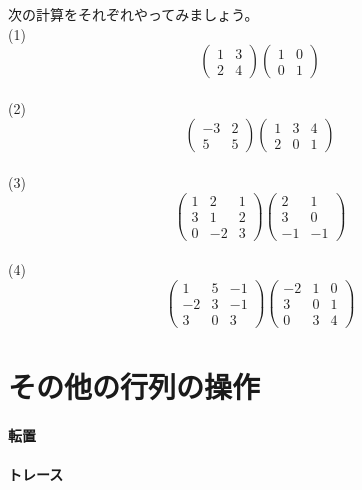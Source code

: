 \documentclass{ltjsbook}
\begin{document}
\begin{reidai}{}{}
    次の計算をそれぞれやってみましょう。\\
    (1) \[   \begin{pmatrix} 1 & 3 \\ 2 & 4 \end{pmatrix} \begin{pmatrix} 1 & 0 \\ 0 & 1 \end{pmatrix}                               \]    \\
    (2) \[   \begin{pmatrix} -3 & 2 \\ 5 & 5 \end{pmatrix} \begin{pmatrix}1& 3 & 4\\ 2 & 0 & 1\end{pmatrix}                            \]    \\
    (3) \[    \begin{pmatrix} 1 & 2 & 1 \\ 3 & 1 & 2 \\ 0 & -2 & 3 \end{pmatrix}\begin{pmatrix}2 & 1 \\ 3 & 0 \\ -1 & -1 \end{pmatrix}  \] \\
    (4)\[    \begin{pmatrix}  1 & 5 & -1 \\ -2 & 3 & -1 \\ 3 & 0 & 3 \end{pmatrix}\begin{pmatrix}  -2 & 1 & 0 \\ 3 & 0 & 1 \\ 0 & 3 & 4       \end{pmatrix} \]
\end{reidai}



\section{その他の行列の操作}
\paragraph{転置}
\paragraph{トレース}
\end{document}
